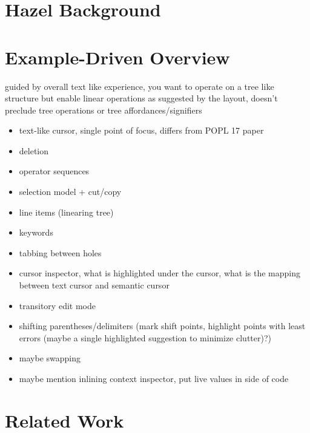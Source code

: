 \documentclass[runningheads]{llncs}
\begin{document}
\section{Hazel Background} \label{sec:hazel-background}

\section{Example-Driven Overview} \label{sec:example}

guided by overall text like experience, you want to operate on a tree like structure but enable linear operations as suggested by the layout, doesn't preclude tree operations or tree affordances/signifiers
\begin{itemize}
\item text-like cursor, single point of focus, differs from POPL 17 paper
\item deletion
\item operator sequences
\item selection model + cut/copy
\item line items (linearing tree)
\item keywords
\item tabbing between holes
\item cursor inspector, what is highlighted under the cursor, what is the mapping between text cursor and semantic cursor
\item transitory edit mode
\item shifting parentheses/delimiters (mark shift points, highlight points with least errors (maybe a single highlighted suggestion to minimize clutter)?)
\item maybe swapping
\item maybe mention inlining context inspector, put live values in side of code
\end{itemize}

\section{Related Work} \label{sec:related-work}
\end{document}
